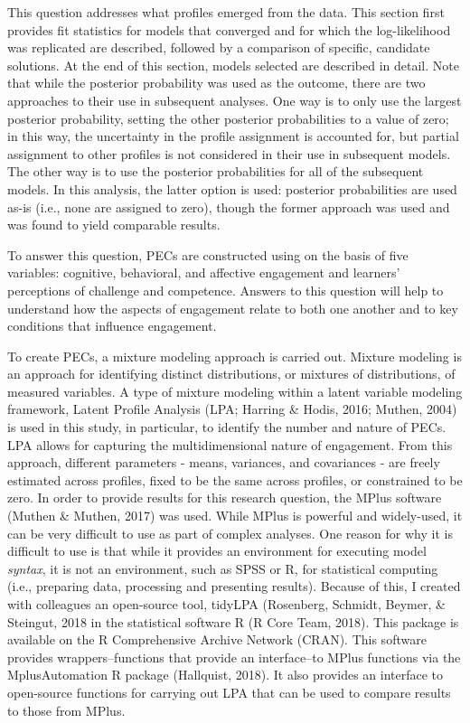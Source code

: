 \documentclass[]{book}
\theoremstyle{definition}
\theoremstyle{definition}
\theoremstyle{definition}
\theoremstyle{remark}
\begin{document}
This question addresses what profiles emerged from the data. This
section first provides fit statistics for models that converged and for
which the log-likelihood was replicated are described, followed by a
comparison of specific, candidate solutions. At the end of this section,
models selected are described in detail. Note that while the posterior
probability was used as the outcome, there are two approaches to their
use in subsequent analyses. One way is to only use the largest posterior
probability, setting the other posterior probabilities to a value of
zero; in this way, the uncertainty in the profile assignment is
accounted for, but partial assignment to other profiles is not
considered in their use in subsequent models. The other way is to use
the posterior probabilities for all of the subsequent models. In this
analysis, the latter option is used: posterior probabilities are used
as-is (i.e., none are assigned to zero), though the former approach was
used and was found to yield comparable results.

To answer this question, PECs are constructed using on the basis of five
variables: cognitive, behavioral, and affective engagement and learners'
perceptions of challenge and competence. Answers to this question will
help to understand how the aspects of engagement relate to both one
another and to key conditions that influence engagement.

To create PECs, a mixture modeling approach is carried out. Mixture
modeling is an approach for identifying distinct distributions, or
mixtures of distributions, of measured variables. A type of mixture
modeling within a latent variable modeling framework, Latent Profile
Analysis (LPA; Harring \& Hodis, 2016; Muthen, 2004) is used in this
study, in particular, to identify the number and nature of PECs. LPA
allows for capturing the multidimensional nature of engagement. From
this approach, different parameters - means, variances, and covariances
- are freely estimated across profiles, fixed to be the same across
profiles, or constrained to be zero. In order to provide results for
this research question, the MPlus software (Muthen \& Muthen, 2017) was
used. While MPlus is powerful and widely-used, it can be very difficult
to use as part of complex analyses. One reason for why it is difficult
to use is that while it provides an environment for executing model
\emph{syntax}, it is not an environment, such as SPSS or R, for
statistical computing (i.e., preparing data, processing and presenting
results). Because of this, I created with colleagues an open-source
tool, tidyLPA (Rosenberg, Schmidt, Beymer, \& Steingut, 2018 in the
statistical software R (R Core Team, 2018). This package is available on
the R Comprehensive Archive Network (CRAN). This software provides
wrappers--functions that provide an interface--to MPlus functions via
the MplusAutomation R package (Hallquist, 2018). It also provides an
interface to open-source functions for carrying out LPA that can be used
to compare results to those from MPlus.
\end{document}

